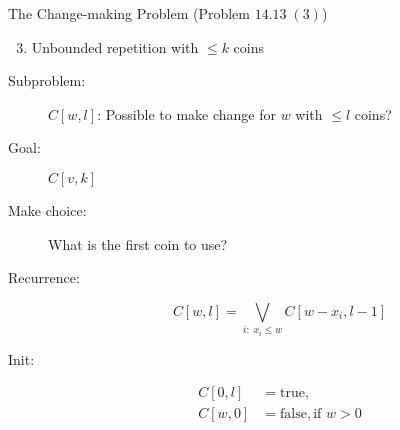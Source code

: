 \begin{frame}{}
  \begin{exampleblock}{The Change-making Problem (Problem $14.13\; (3)$)}
    \begin{enumerate}[(1)]
      \setcounter{enumi}{2}
      \item Unbounded repetition with $\le k$ coins
    \end{enumerate}
  \end{exampleblock}

  \pause
  \begin{description}
	\item[Subproblem:] $C[w,l]$: Possible to make change for $w$ with $\le l$ coins?
	\item[Goal:] $C[v,k]$
	  \pause
	\item[Make choice:] What is the first coin to use?
	\item[Recurrence:] 
	  \[
		C[w,l] = \bigvee_{i: \; x_i \le w} C[w-x_i, l-1]
	  \]
	  \pause
	\item[Init:]
	  \begin{align*}
		C[0,l] &= \text{true}, \\
		C[w,0] &= \text{false}, \text{if } w > 0
	  \end{align*}
  \end{description}
\end{frame}
